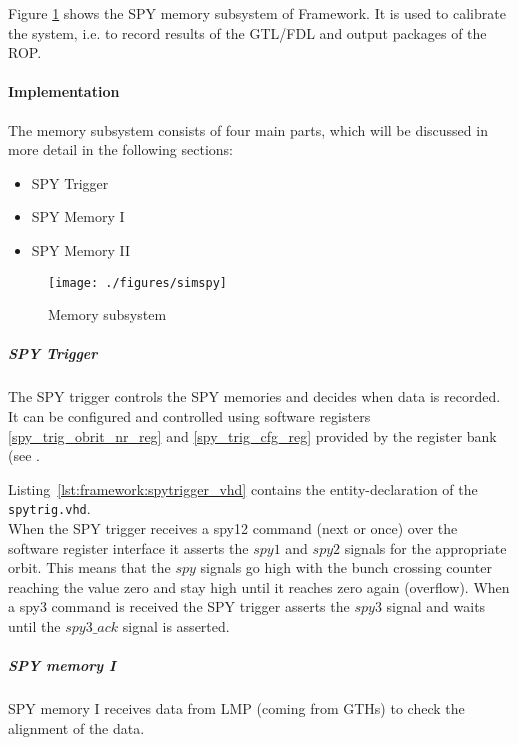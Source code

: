 Figure \ref{fig_simspy} shows the SPY memory subsystem of Framework.
It is used to calibrate the system, i.e. to record results of the GTL/FDL and output packages of the ROP.

\paragraph{Implementation}\label{sec:framework:spy_impl}
The memory subsystem consists of four main parts, which will be discussed in more detail in the following sections:

\begin{itemize}
\item SPY Trigger
\item SPY Memory I
\item SPY Memory II
\end{itemize}

\begin{figure}[h]
\texttt{[image: ./figures/simspy]}
\caption{Memory subsystem}
\label{fig_simspy}
\end{figure}

\subparagraph{SPY Trigger}\label{sec:framework:spy_trigger}
The SPY trigger controls the SPY memories and decides when data is recorded. It can be configured and controlled using
software registers \ref{spy_trig_obrit_nr_reg} and \ref{spy_trig_cfg_reg} provided by the register bank (see .

Listing~\ref{lst:framework:spytrigger_vhd} contains the entity-declaration of the \texttt{spytrig.vhd}.\\



When the SPY trigger receives a spy12 command (next or once) over the software register interface it asserts the $spy1$ and $spy2$ signals for the appropriate orbit.
This means that the $spy$ signals go high with the bunch crossing counter reaching the value zero and stay high until it reaches zero again (overflow).
When a spy3 command is received the SPY trigger asserts the $spy3$ signal and waits until the $spy3\_ack$ signal is asserted.

\subparagraph{SPY memory I}
SPY memory I receives data from LMP (coming from GTHs) to check the alignment of the data.


